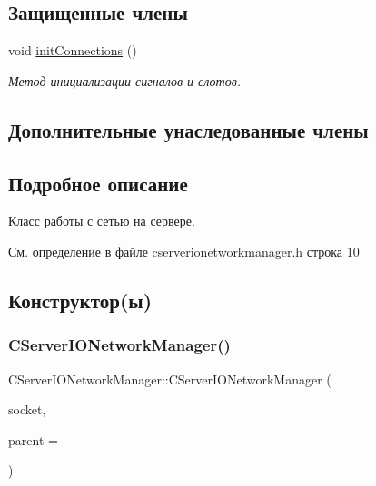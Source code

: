 \subsection*{Защищенные члены}
\begin{DoxyCompactItemize}
\item 
void \hyperlink{class_c_server_i_o_network_manager_a17155570c51dc951db52d827f120c689}{init\+Connections} ()
\begin{DoxyCompactList}\small\item\em Метод инициализации сигналов и слотов. \end{DoxyCompactList}\end{DoxyCompactItemize}
\subsection*{Дополнительные унаследованные члены}


\subsection{Подробное описание}
Класс работы с сетью на сервере. 

См. определение в файле cserverionetworkmanager.\+h строка 10



\subsection{Конструктор(ы)}
\hypertarget{class_c_server_i_o_network_manager_a89afb0912a02b5745aaad5ccea706304}{}\label{class_c_server_i_o_network_manager_a89afb0912a02b5745aaad5ccea706304} 
\subsubsection{\texorpdfstring{C\+Server\+I\+O\+Network\+Manager()}{CServerIONetworkManager()}}
{\footnotesize\ttfamily C\+Server\+I\+O\+Network\+Manager\+::\+C\+Server\+I\+O\+Network\+Manager (\begin{DoxyParamCaption}\item[{Q\+Tcp\+Socket $\ast$}]{socket,  }\item[{Q\+Object $\ast$}]{parent = {} }\end{DoxyParamCaption})}



